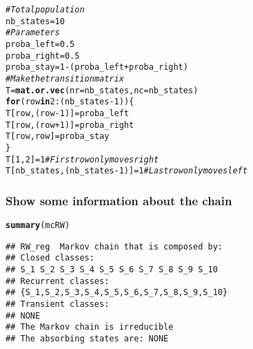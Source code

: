 \documentclass[aspectratio=169]{beamer}\usepackage[]{graphicx}\usepackage[]{xcolor}
\makeatletter
\newcommand{\hlnum}[1]{\textcolor[rgb]{0.686,0.059,0.569}{#1}}%
\newcommand{\hlsng}[1]{\textcolor[rgb]{0.192,0.494,0.8}{#1}}%
\newcommand{\hlcom}[1]{\textcolor[rgb]{0.678,0.584,0.686}{\textit{#1}}}%
\newcommand{\hlopt}[1]{\textcolor[rgb]{0,0,0}{#1}}%
\newcommand{\hldef}[1]{\textcolor[rgb]{0.345,0.345,0.345}{#1}}%
\newcommand{\hlkwa}[1]{\textcolor[rgb]{0.161,0.373,0.58}{\textbf{#1}}}%
\newcommand{\hlkwb}[1]{\textcolor[rgb]{0.69,0.353,0.396}{#1}}%
\newcommand{\hlkwc}[1]{\textcolor[rgb]{0.333,0.667,0.333}{#1}}%
\newcommand{\hlkwd}[1]{\textcolor[rgb]{0.737,0.353,0.396}{\textbf{#1}}}%
\newenvironment{kframe}{%
 \def\at@end@of@kframe{}%
 \ifinner\ifhmode%
  \def\at@end@of@kframe{\end{minipage}}%
  \begin{minipage}{\columnwidth}%
 \fi\fi%
 \def\FrameCommand##1{\hskip\@totalleftmargin \hskip-\fboxsep
 \colorbox{shadecolor}{##1}\hskip-\fboxsep
     \hskip-\linewidth \hskip-\@totalleftmargin \hskip\columnwidth}%
 \MakeFramed {\advance\hsize-\width
   \@totalleftmargin\z@ \linewidth\hsize
   \@setminipage}}%
 {\par\unskip\endMakeFramed%
 \at@end@of@kframe}
\newenvironment{knitrout}{}{} %
\makeatother
\begin{document}
\begin{knitrout}
\color{fgcolor}\begin{kframe}
\begin{alltt}
\hlcom{# Total population}
\hldef{nb_states} \hlkwb{=} \hlnum{10}
\hlcom{# Parameters}
\hldef{proba_left} \hlkwb{=} \hlnum{0.5}
\hldef{proba_right} \hlkwb{=} \hlnum{0.5}
\hldef{proba_stay} \hlkwb{=} \hlnum{1}\hlopt{-}\hldef{(proba_left}\hlopt{+}\hldef{proba_right)}
\hlcom{# Make the transition matrix}
\hldef{T} \hlkwb{=} \hlkwd{mat.or.vec}\hldef{(}\hlkwc{nr} \hldef{= nb_states,} \hlkwc{nc} \hldef{= nb_states)}
\hlkwa{for} \hldef{(row} \hlkwa{in} \hlnum{2}\hlopt{:}\hldef{(nb_states}\hlopt{-}\hlnum{1}\hldef{)) \{}
  \hldef{T[row,(row}\hlopt{-}\hlnum{1}\hldef{)]} \hlkwb{=} \hldef{proba_left}
  \hldef{T[row,(row}\hlopt{+}\hlnum{1}\hldef{)]} \hlkwb{=} \hldef{proba_right}
  \hldef{T[row, row]} \hlkwb{=} \hldef{proba_stay}
\hldef{\}}
\hldef{T[}\hlnum{1}\hldef{,}\hlnum{2}\hldef{]} \hlkwb{=} \hlnum{1} \hlcom{# First row only moves right}
\hldef{T[nb_states, (nb_states}\hlopt{-}\hlnum{1}\hldef{)]} \hlkwb{=} \hlnum{1} \hlcom{# Last row only moves left}
\end{alltt}
\end{kframe}
\end{knitrout}


\begin{frame}[fragile]\frametitle{Show some information about the chain}
\begin{knitrout}
\color{fgcolor}\begin{kframe}
\begin{alltt}
\hlkwd{summary}\hldef{(mcRW)}
\end{alltt}
\begin{verbatim}
## RW_reg  Markov chain that is composed by: 
## Closed classes: 
## S_1 S_2 S_3 S_4 S_5 S_6 S_7 S_8 S_9 S_10 
## Recurrent classes: 
## {S_1,S_2,S_3,S_4,S_5,S_6,S_7,S_8,S_9,S_10}
## Transient classes: 
## NONE 
## The Markov chain is irreducible 
## The absorbing states are: NONE
\end{verbatim}
\end{kframe}
\end{knitrout}
\end{frame}
\end{document}

